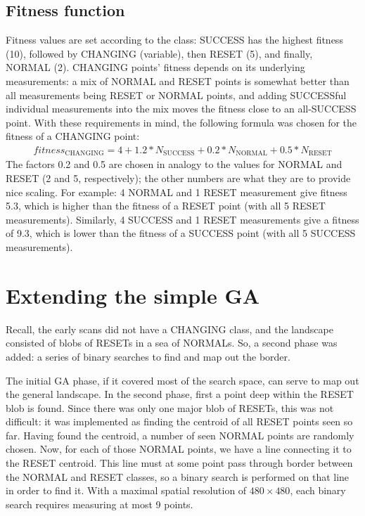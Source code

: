 \documentclass[times, utf8, diplomski]{fer}
\begin{document}
\subsection{Fitness function}
Fitness values are set according to the class: SUCCESS has the highest fitness
(10), followed by CHANGING (variable), then RESET (5), and finally, NORMAL (2).
CHANGING points' fitness depends on its underlying measurements: a mix of NORMAL
and RESET points is somewhat better than all measurements being RESET or NORMAL
points, and adding SUCCESSful individual measurements into the mix moves the
fitness close to an all-SUCCESS point. With these requirements in mind, the
following formula was chosen for the fitness of a CHANGING point:
\begin{eqnarray}
    fitness_{\text{CHANGING}} = 4 + 1.2*N_{\text{SUCCESS}} + 0.2*N_{\text{NORMAL}} + 0.5*N_{\text{RESET}} \nonumber
\end{eqnarray}
The factors 0.2 and 0.5 are chosen in analogy to the values for NORMAL
and RESET (2 and 5, respectively); the other numbers are what they are to
provide nice scaling.
For example: 4 NORMAL and 1 RESET measurement give fitness 5.3, which is higher
than the fitness of a RESET point (with all 5 RESET measurements). Similarly,
4 SUCCESS and 1 RESET measurements give a fitness of 9.3, which is lower than
the fitness of a SUCCESS point (with all 5 SUCCESS measurements).



\section{Extending the simple GA}\label{sec:extending-GA}
Recall, the early scans did not have a CHANGING class, and the landscape consisted
of blobs of RESETs in a sea of NORMALs. So, a second phase was added: a series of
binary searches to find and map out the border.

The initial GA phase, if it covered most of the search space, can serve to map
out the general landscape. In the second phase, first a point deep within the
RESET blob is found. Since there was only one major blob of RESETs, this was not
difficult: it was implemented as finding the centroid of all RESET points seen
so far. Having found the centroid, a number of seen NORMAL points are randomly
chosen. Now, for each of those NORMAL points, we have a line connecting it to
the RESET centroid. This line must at some point pass through border between
the NORMAL and RESET classes, so a binary search is performed on that line in
order to find it. With a maximal spatial resolution of $480 \times 480$, each
binary search requires measuring at most 9 points.
\end{document}
